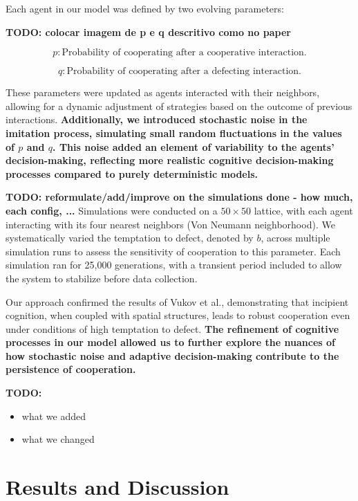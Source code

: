 \documentclass[runningheads]{llncs}
\begin{document}
Each agent in our model was defined by two evolving parameters:

\textbf{TODO: colocar imagem de p e q descritivo como no paper}

\[
p: \text{Probability of cooperating after a cooperative interaction.}
\]

\[
q: \text{Probability of cooperating after a defecting interaction.}
\]

These parameters were updated as agents interacted with their neighbors, allowing for a dynamic adjustment of strategies based on the outcome of previous interactions. \textbf{Additionally, we introduced stochastic noise in the imitation process, simulating small random fluctuations in the values of \( p \) and \( q \). This noise added an element of variability to the agents' decision-making, reflecting more realistic cognitive decision-making processes compared to purely deterministic models.}

\textbf{TODO: reformulate/add/improve on the simulations done - how much, each config, ...}
Simulations were conducted on a \( 50 \times 50 \) lattice, with each agent interacting with its four nearest neighbors (Von Neumann neighborhood). We systematically varied the temptation to defect, denoted by \( b \), across multiple simulation runs to assess the sensitivity of cooperation to this parameter. Each simulation ran for 25,000 generations, with a transient period included to allow the system to stabilize before data collection.

Our approach confirmed the results of Vukov et al., demonstrating that incipient cognition, when coupled with spatial structures, leads to robust cooperation even under conditions of high temptation to defect. \textbf{The refinement of cognitive processes in our model allowed us to further explore the nuances of how stochastic noise and adaptive decision-making contribute to the persistence of cooperation.}

\textbf{TODO:}
\begin{itemize}
    \item what we added
    \item what we changed
\end{itemize}





\section{Results and Discussion}
\end{document}
